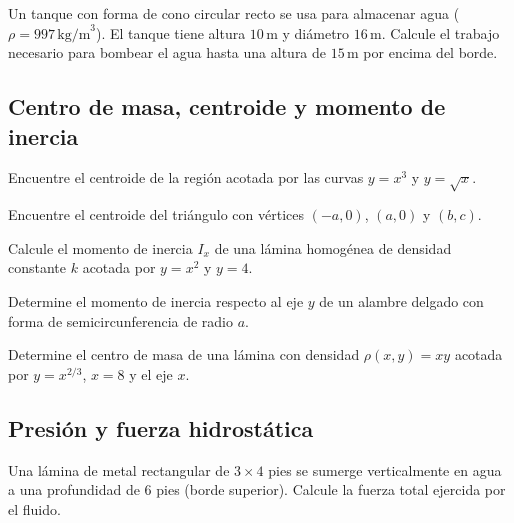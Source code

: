 \begin{prob}
Un tanque con forma de cono circular recto se usa para almacenar agua ($\rho=997\,\text{kg/m}^3$). El tanque tiene altura $10\,\text{m}$ y diámetro $16\,\text{m}$. Calcule el trabajo necesario para bombear el agua hasta una altura de $15\,\text{m}$ por encima del borde.
\end{prob}

\subsection{Centro de masa, centroide y momento de inercia}


\begin{prob}
Encuentre el centroide de la región acotada por las curvas $y = x^3$ y $y = \sqrt{x}$.
\end{prob}

\begin{prob}
Encuentre el centroide del triángulo con vértices $(-a, 0)$, $(a, 0)$ y $(b, c)$.
\end{prob}

\begin{prob}
Calcule el momento de inercia $I_x$ de una lámina homogénea de densidad constante $k$ acotada por $y = x^2$ y $y = 4$.
\end{prob}

\begin{prob}
Determine el momento de inercia respecto al eje $y$ de un alambre delgado con forma de semicircunferencia de radio $a$.
\end{prob}


\begin{prob}
Determine el centro de masa de una lámina con densidad $\rho(x,y) = xy$ acotada por $y = x^{2/3}$, $x = 8$ y el eje $x$.
\end{prob}

\subsection{Presión y fuerza hidrostática}


\begin{prob}
Una lámina de metal rectangular de $3 \times 4$ pies se sumerge verticalmente en agua a una profundidad de 6 pies (borde superior). Calcule la fuerza total ejercida por el fluido.
\end{prob}

